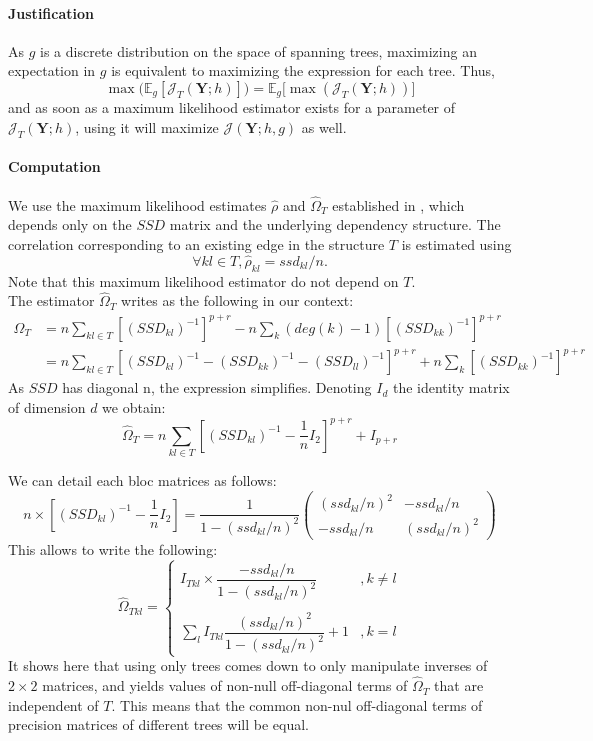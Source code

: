 \documentclass[11pt,a4paper]{article}
\newcommand{\Ybf}{\boldsymbol{Y}}
\newcommand{\Esp}{\mathds{E}}
\begin{document}
 
\paragraph{Justification\\}

As $g$ is a discrete distribution on the space of spanning trees, maximizing an expectation in $g$ is equivalent to maximizing the expression for each tree. Thus,
$$ \max\big(\Esp_g[\mathcal{J}_T(\Ybf;h)]\big) = \Esp_g\big[\max(\mathcal{J}_T(\Ybf;h))\big]$$
and as soon as a maximum likelihood estimator exists for a parameter of $\mathcal{J}_T(\Ybf;h)$, using it will maximize $\mathcal{J}(\Ybf;h,g)$ as well. 

\paragraph{Computation\\}
 We use the maximum likelihood estimates $\hat{\rho}$ and $\hat{\Omega}_T$ established in \citet{Lau96}, which depends only on the $SSD$ matrix and the underlying dependency structure.
  The correlation corresponding to an existing edge in the structure $T$ is estimated using
  $$ \forall kl\in T,\boxed{\hat{\rho}_{kl} = ssd_{kl}/n}.$$
  Note that this maximum likelihood estimator do not depend on $T$.\\
  
   The estimator  $\hat{\Omega}_T$  writes as the following in our context:
\begin{align*}
\widehat{\Omega}_T &= n  \sum_{kl\in T}   [(SSD_{kl})^{-1}]^{p+r} - n\sum_k (deg(k)-1)[(SSD_{kk})^{-1}]^{p+r}\\
&=n \sum_{kl\in T}  [(SSD_{kl})^{-1} - (SSD_{kk})^{-1} -  (SSD_{ll})^{-1} ]^{p+r} + n\sum_k[(SSD_{kk})^{-1}]^{p+r}
\end{align*}
As $SSD$ has diagonal n, the expression simplifies. Denoting $I_d$ the identity matrix of dimension $d$ we obtain:
$$\widehat{\Omega}_T =n\sum_{kl\in T} [(SSD_{kl})^{-1} -\frac{1}{n} I_2]^{p+r}+ I_{p+r}$$

We can detail each bloc matrices as follows:
\[
n\times [(SSD_{kl})^{-1} - \frac{1}{n}I_2] = \frac{1}{1-(ssd_{kl}/n)^2}
\left(\begin{array}{cc}
		(ssd_{kl}/n)^2   & -ssd_{kl}/n\\
		-ssd_{kl}/n& (ssd_{kl}/n)^2 
		\end{array}\right)
\]
This allows to write the following:
 \[ \boxed{\widehat{\Omega}_{Tkl}=\left\{\begin{array}{cl}I_{Tkl}
  \times\dfrac{ -ssd_{kl}/n}{1-(ssd_{kl}/n)^2} & ,k\neq l\\\\
 \sum_l I_{Tkl} \dfrac{(ssd_{kl}/n)^2}{1-(ssd_{kl}/n)^2} +1 & ,k=l
 \end{array}\right.
 }\]
It shows here that using only trees comes down to only manipulate inverses of $2\times 2$ matrices, and yields values of non-null off-diagonal terms of $\hat{\Omega}_T$ that are independent of $T$. This means that the common non-nul off-diagonal terms of precision matrices of different trees will be equal. \\
\end{document}
